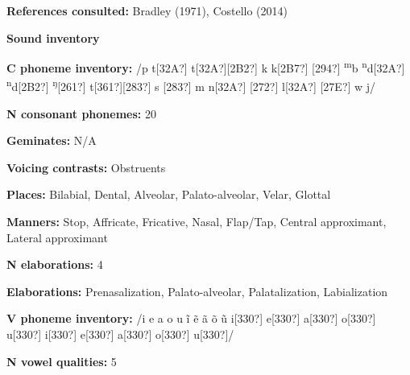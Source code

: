 \begin{styleBody}
\textbf{References consulted: }Bradley (1971), Costello (2014)
\end{styleBody}

\begin{styleBody}
\textbf{Sound inventory}
\end{styleBody}

\begin{styleBody}
\textbf{C phoneme inventory:} /p t[32A?] t[32A?][2B2?] k k[2B7?] [294?] \textsuperscript{m}b \textsuperscript{n}d[32A?] \textsuperscript{n}d[2B2?] \textsuperscript{ŋ}[261?] t[361?][283?] s [283?] m n[32A?] [272?] l[32A?] [27E?] w j/
\end{styleBody}

\begin{styleBody}
\textbf{N consonant phonemes:} 20
\end{styleBody}

\begin{styleBody}
\textbf{Geminates:} N/A
\end{styleBody}

\begin{styleBody}
\textbf{Voicing contrasts:} Obstruents
\end{styleBody}

\begin{styleBody}
\textbf{Places:} Bilabial, Dental, Alveolar, Palato-alveolar, Velar, Glottal
\end{styleBody}

\begin{styleBody}
\textbf{Manners:} Stop, Affricate, Fricative, Nasal, Flap/Tap, Central approximant, Lateral approximant
\end{styleBody}

\begin{styleBody}
\textbf{N elaborations:} 4
\end{styleBody}

\begin{styleBody}
\textbf{Elaborations:} Prenasalization, Palato-alveolar, Palatalization, Labialization
\end{styleBody}

\begin{styleBody}
\textbf{V phoneme inventory:} /i e a o u \~{i} \~{e} \~{a} \~{o} \~{u} i[330?] e[330?] a[330?] o[330?] u[330?] i[330?] e[330?] a[330?] o[330?] u[330?]/
\end{styleBody}

\begin{styleBody}
\textbf{N vowel qualities:} 5
\end{styleBody}

